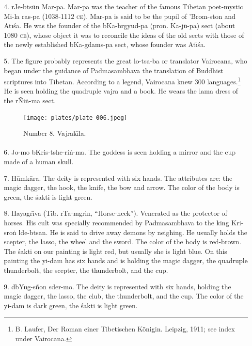 \documentclass[a4paper, 12pt, oneside]{article}
\begin{document}
4. rJe-btsün Mar-pa. Mar-pa was the teacher of the famous Tibetan poet-mystic Mi-la ras-pa (1038-1112 \textsc{ce}). Mar-pa is said to be the pupil of 'Brom-ston and At\={\i}\'{s}a. He was the founder of the bKa-brgyud-pa (pron. Ka-jü-pa) sect (about 1080 \textsc{ce}), whose object it was to reconcile the ideas of the old sects with those of the newly established bKa-gdams-pa sect, whose founder was At\={\i}\'{s}a.

5. The figure probably represents the great lo-tsa-ba or translator Vairocana, who began under the guidance of Padmasambhava the translation of Buddhist scriptures into Tibetan. According to a legend, Vairocana knew 300 languages.\footnote{B. Laufer, Der Roman einer Tibetischen Königin. Leipzig, 1911; see index under Vairocana.} He is seen holding the quadruple vajra and a book. He wears the lama dress of the rÑi\.{n}-ma sect.
\clearpage
\vspace*{\fill}
\begin{figure}[H]
\centering
\texttt{[image: plates/plate-006.jpeg]}
\caption*{Number 8. Vajrak\={\i}la.}
\end{figure}
\vspace*{\fill}
\clearpage
\paragraph{}
6. Jo-mo bKris-tshe-ri\.{n}-ma. The goddess is seen holding a mirror and the cup made of a human skull.

7. H\={u}mk\={a}ra. The deity is represented with six hands. The attributes are: the magic dagger, the hook, the knife, the bow and arrow. The color of the body is green, the \'{s}akti is light green.

8. Hayagr\={\i}va (Tib. rTa-mgrin, ``Horse-neck''). Venerated as the protector of horses. His cult was specially recommended by Padmasambhava to the king Kri-sro\.{n} lde-btsan. He is said to drive away demons by neighing. He usually holds the scepter, the lasso, the wheel and the sword. The color of the body is red-brown. The \'{s}akti on our painting is light red, but usually she is light blue. On this painting the yi-dam has six hands and is holding the magic dagger, the quadruple thunderbolt, the scepter, the thunderbolt, and the cup.

9. dbYug-s\~{n}on sder-mo. The deity is represented with six hands, holding the magic dagger, the lasso, the club, the thunderbolt, and the cup. The color of the yi-dam is dark green, the \'{s}akti is light green.
\end{document}

